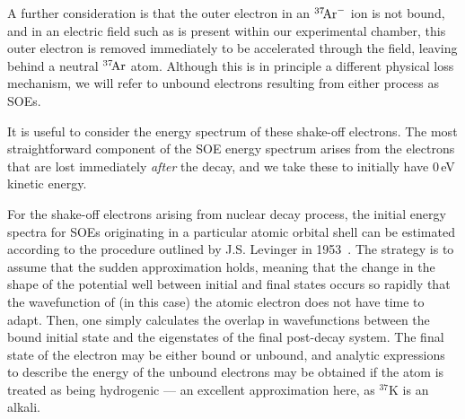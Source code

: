 A further consideration is that the outer electron in an $^{37}\textrm{\!Ar}^{-}$ ion is not bound\cite{ArgonMinusIons}, and in an electric field such as is present within our experimental chamber, this outer electron is removed immediately to be accelerated through the field, leaving behind a neutral $^{37}\textrm{\!Ar}$ atom.  Although this is in principle a different physical loss mechanism, we will refer to unbound electrons resulting from either process as SOEs.  

It is useful to consider the energy spectrum of these shake-off electrons.  The most straightforward component of the SOE energy spectrum arises from the electrons that are lost immediately \emph{after} the decay, and we take these to initially have 0\,eV kinetic energy.  

For the shake-off electrons arising from nuclear decay process, the initial energy spectra for SOEs originating in a particular atomic orbital shell can be estimated according to the procedure outlined by J.S. Levinger in 1953~\cite{Levinger}.
%
The strategy is to assume that the sudden approximation holds, meaning that the change in the shape of the potential well between initial and final states occurs so rapidly that the wavefunction of (in this case) the atomic electron does not have time to adapt.  Then, one simply calculates the overlap in wavefunctions between the bound initial state and the eigenstates of the final post-decay system.  The final state of the electron may be either bound or unbound, and analytic expressions to describe the energy of the unbound electrons may be obtained if the atom is treated as being hydrogenic --- an excellent approximation here, as $^{37}\textrm{K}$ is an alkali.  
%

